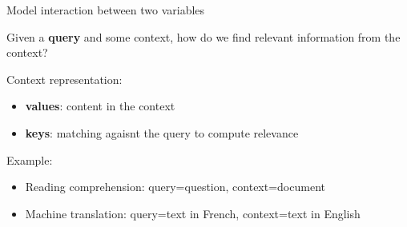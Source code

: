 \documentclass[usenames,dvipsnames,notes,11pt,aspectratio=169,hyperref={colorlinks=true, linkcolor=blue}]{beamer}
\begin{document}
%
%

\begin{frame}
    {Model interaction between two variables}

    Given a {\bf query} and some context, how do we find relevant information from the context?

    Context representation:\\
    \begin{itemize}
        \item {\bf values}: content in the context 
        \item {\bf keys}: matching agaisnt the query to compute relevance
    \end{itemize}

    \pause
    Example:\\
    \begin{itemize}
        \item Reading comprehension: query=question, context=document
        \item Machine translation: query=text in French, context=text in English
    \end{itemize}
\end{frame}
\end{document}

